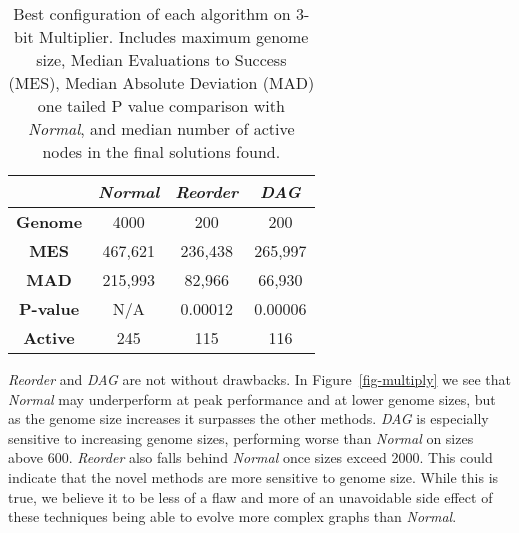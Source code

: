 \documentclass{sig-alternate}
\begin{document}
\begin{table}
	\centering
	\begin{tabular}{|c|c|c|c|}
	  \hline
& \textbf{\emph{Normal}} & \textbf{\emph{Reorder}} & \textbf{\emph{DAG}} \\ \hline
\textbf{Genome} & 4000   & 200     & 200 \\ \hline
  \textbf{MES} & 467,621 & 236,438 & 265,997 \\ \hline
  \textbf{MAD} & 215,993 & 82,966  & 66,930 \\ \hline
  \textbf{P-value} & N/A & 0.00012 & 0.00006 \\ \hline
  \textbf{Active} & 245  & 115     & 116 \\ \hline

	\end{tabular}
	\caption{Best configuration of each algorithm on 3-bit Multiplier.
	Includes maximum genome size, Median Evaluations to Success (MES), Median Absolute Deviation (MAD)
	one tailed P value comparison with \emph{Normal}, and median number of active
	nodes in the final solutions found.}
	\label{table-multiply}
\end{table}

\emph{Reorder} and \emph{DAG} are not without drawbacks.  In Figure~\ref{fig-multiply} we see that
\emph{Normal} may underperform at peak performance and at lower genome sizes, but
as the genome size increases it surpasses the other methods.  \emph{DAG} is especially
sensitive to increasing genome sizes, performing worse than \emph{Normal} on sizes above 600.
\emph{Reorder} also falls behind \emph{Normal} once sizes exceed 2000.  This
could indicate that the novel methods are more sensitive to genome size.
While this is true, we believe it to be less of a flaw and more of an unavoidable side
effect of these techniques being able to evolve more complex graphs than \emph{Normal}.
\end{document}
